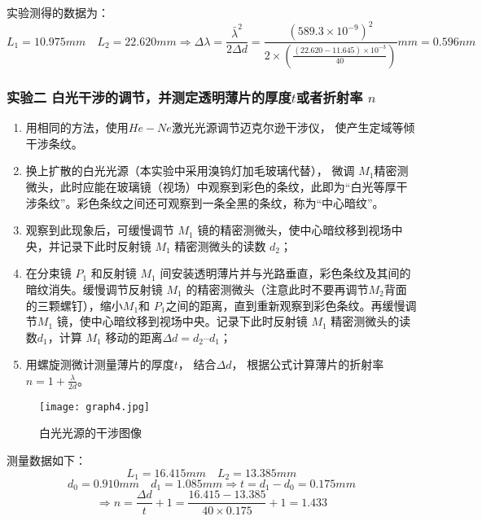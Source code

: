 \documentclass[dvipsnames, svgnames,a4paper,11pt]{article}
\begin{document}
		实验测得的数据为：
		\[ 
		L_1=10.975mm \quad L_2=22.620mm \Longrightarrow \Delta\lambda=\frac{\bar{\lambda}^2}{2\Delta d}=\frac{(589.3\times10^{-9})^2}{2\times(\frac{(22.620-11.645)\times10^{-3}}{40})}mm=0.596nm
		 \]
		

		
		
		
		
		

	\subsubsection{实验二 白光干涉的调节，并测定透明薄片的厚度$t$或者折射率 $n$}
		
		\begin{enumerate}
			\item 用相同的方法，使用$He-Ne$激光光源调节迈克尔逊干涉仪， 使产生定域等倾干涉条纹。
			
			\item 换上扩散的白光光源（本实验中采用溴钨灯加毛玻璃代替）， 微调 $M_1$精密测微头，此时应能在玻璃镜（视场）中观察到彩色的条纹，此即为“白光等厚干涉条纹”。彩色条纹之间还可观察到一条全黑的条纹，称为“中心暗纹”。
			
			\item 观察到此现象后，可缓慢调节 $M_1$ 镜的精密测微头，使中心暗纹移到视场中央，并记录下此时反射镜 $M_1$ 精密测微头的读数 $d_2$；
			
			\item 在分束镜 $P_1$ 和反射镜 $M_1$ 间安装透明薄片并与光路垂直，彩色条纹及其间的暗纹消失。缓慢调节反射镜 $M_1$ 的精密测微头（注意此时不要再调节$M_2$背面的三颗螺钉），缩小$ M_1 $和 $P_1$之间的距离，直到重新观察到彩色条纹。再缓慢调节$ M_1$ 镜，使中心暗纹移到视场中央。记录下此时反射镜 $M_1$ 精密测微头的读数$ d_1$，计算 $M_1$ 移动的距离$\Delta d = d_2 – d_1$；
			
			\item 用螺旋测微计测量薄片的厚度$ t$， 结合$\Delta d$， 根据公式计算薄片的折射率 $n=1+\frac{\lambda}{2d}$。
		\end{enumerate}
		
		\begin{figure}[htbp]
			\centering
			\texttt{[image: graph4.jpg]}
			\caption{白光光源的干涉图像}
			\label{fig:graph4}
		\end{figure}
		
		测量数据如下：
		\[ 
		L_1=16.415mm \quad L_2=13.385mm
		 \]
		\[ 
		d_0=0.910mm \quad d_1=1.085mm\Longrightarrow t=d_1-d_0=0.175mm
		 \]
		\[ 
		\Longrightarrow n=\frac{\Delta d}{t}+1=\frac{16.415-13.385}{40\times0.175}+1=1.433
		 \]
		
\end{document}
